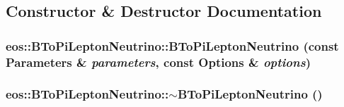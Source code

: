 \subsection{Constructor \& Destructor Documentation}
\hypertarget{classeos_1_1BToPiLeptonNeutrino_a62aff0479721942c6b06693a23b42345}{
\subsubsection[{BToPiLeptonNeutrino}]{\setlength{\rightskip}{0pt plus 5cm}eos::BToPiLeptonNeutrino::BToPiLeptonNeutrino (const {\bf Parameters} \& {\em parameters}, \/  const {\bf Options} \& {\em options})}}
\label{classeos_1_1BToPiLeptonNeutrino_a62aff0479721942c6b06693a23b42345}
\hypertarget{classeos_1_1BToPiLeptonNeutrino_a33601618dfaa42dc8893612fccf5451e}{
\subsubsection[{$\sim$BToPiLeptonNeutrino}]{\setlength{\rightskip}{0pt plus 5cm}eos::BToPiLeptonNeutrino::$\sim$BToPiLeptonNeutrino ()}}
\label{classeos_1_1BToPiLeptonNeutrino_a33601618dfaa42dc8893612fccf5451e}


